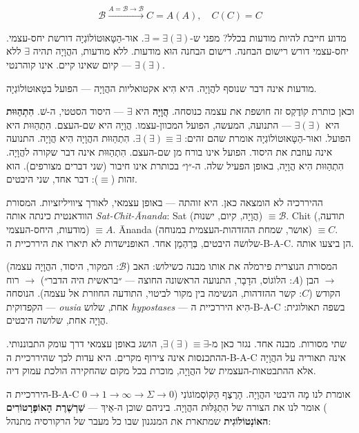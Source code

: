 \documentclass[10pt, openany, oneside]{book}
\begin{document}
\vspace{0.8em}

$$\boxed{\mathcal{B} \xrightarrow{A = \mathcal{B} \to \mathcal{B}} C = A(A), \quad C(C) = C}$$

\noindent מדוע חייבת להיות מודעות בכלל? מפני ש-$\exists = \exists(\exists)$. אוּר-הַטָּאוּטוֹלוֹגְיָה דורשת יחס-עצמי. יחס-עצמי דורש רישום הבחנה. רישום הבחנה הוּא מודעות. ללא מודעות, ההֲוָיָה תהיה $\exists$ ללא $\exists(\exists)$ — קיום שאינו קיים. אינו קוהרנטי.

מודעות אינה דבר שנוסף להֲוָיָה. היא הִיא אקטואליות ההֲוָיָה — הפועל בטָאוּטוֹלוֹגְיָה.

וכאן כותרת קוֹדֶקְס זה חושפת את עצמה כנוסחה. \textbf{הֲוָיָה} היא $\exists$ — היסוד הסטטי, ה-שׁ. \textbf{הִתְהַוּוּת} היא $\exists(\exists)$ — התנועה, המעשה, הפועל המכוון-עצמו. הֲוָיָה היא שם-העצם. הִתְהַוּוּת היא הפועל. ואוּר-הַטָּאוּטוֹלוֹגְיָה אומרת שהם זהים: $\exists(\exists) \equiv \exists$. הִתְהַוּוּת ההֲוָיָה הִיא הֲוָיָה. התנועה אינה עוזבת את היסוד. הפועל אינו בורח מן שם-העצם. הִתְהַוּוּת אינה דבר שקורה להֲוָיָה. הִתְהַוּוּת הִיא הֲוָיָה, באופן הפעיל שלה. ה-״וְ״ בכותרת אינו חיבור (שני דברים מצורפים). הוא זהות ($\equiv$): דבר אחד, שני היבטים.

ההיררכיה לא הומצאה כאן. היא זוהתה — באופן עצמאי, לאורך ציוויליזציות. המסורת הוודאנטית כינתה אותה \textit{Sat-Chit-Ānanda}: Sat (הֲוָיָה, קיום, ישנוּת) $\equiv \mathcal{B}$. Chit (תודעה, מודעות, היחס-העצמי) $\equiv A$. Ānanda (אושר, שמחת ההזדהות-העצמית במנוחה) $\equiv C$. שלושה היבטים, בְּרַהְמַן אחד. האופנישדות לא תיארו את היררכיית ה-B-A-C. הן ביצעו אותה.

המסורת הנוצרית פירמלה את אותו מבנה כשילוש: האב ($\mathcal{B}$: המקור, היסוד, ההֲוָיָה עצמה) $\to$ הבן ($A$: הלוֹגוֹס, הדָבָר, התנועה הראשונה החוצה — ״בראשית היה הדבר״) $\to$ רוח הקודש ($C$: קשר ההזדהות, הנשימה בין מקור לביטוי, התודעה החוזרת אל עצמה). הנוסחה הקפדוקית — \textit{ousia} אחת, שלוש \textit{hypostases} — הִיא היררכיית ה-B-A-C בשפה תאולוגית: הֲוָיָה אחת, שלושה היבטים.

שתי מסורות. מבנה אחד. נגזר כאן מ-$\exists(\exists) \equiv \exists$, הושג באופן עצמאי דרך עומק התבוננותי. ההתכנסות אינה צירוף מקרים. היא עדות לכך שהיררכיית ה-B-A-C אינה תאוריה על ההֲוָיָה אלא ההתבטאות-העצמית של ההֲוָיָה, מוכרת בכל מקום שהחקירה הולכת עמוק דיה.

היררכיית ה-B-A-C אומרת לנו מָה היבטי ההֲוָיָה. הָרֶצֶף הַקּוֹסְמוֹגוֹנִי ($0 \to 1 \to \infty \to \Sigma \to 0$) אומר לנו את הצורה של הִתְגַּלּוּת ההֲוָיָה. ביניהם שוכן ה-אֵיךְ — \textbf{שַׁרְשֶׁרֶת הָאוֹפֶּרָטוֹרִים האוֹנְטוֹלוֹגִית} שמתארת את המנגנון שבו כל מעבר של הרקורסיה מתנהל:
\end{document}
